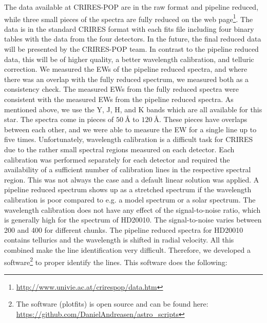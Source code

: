 \documentclass{aa}
\begin{document}
The data available at CRIRES-POP are in the raw format and pipeline
reduced, while three small pieces of the spectra are fully reduced on the web
page\footnote{\url{http://www.univie.ac.at/crirespop/data.htm}}. The data
is in the standard CRIRES format with each fits file including four
binary tables with the data from the four detectors. In the future, the final
reduced data will be presented by the CRIRES-POP team. In contrast to the pipeline reduced data, this
will be of higher quality, a better wavelength calibration, and telluric correction. We
measured the EWs of the pipeline reduced spectra, and where there was
an overlap with the fully reduced spectrum, we measured both as a
consistency check. The measured EWs from the fully reduced spectra were
consistent with the measured EWs from the pipeline reduced spectra. As
mentioned above, we use the Y, J, H, and K bands which are all available
for this star. The spectra come in pieces of $\SI{50}{\angstrom}$
to $\SI{120}{\angstrom}$. These pieces have overlaps between each
other, and we were able to measure the EW for a single line up to
five times. Unfortunately, wavelength calibration is a difficult task
for CRIRES due to the rather small spectral regions measured on each
detector. Each calibration was performed separately for each detector
and required the availability of a sufficient number of calibration
lines in the respective spectral region. This was not always the case
and a default linear solution was applied. A pipeline reduced spectrum
shows up as a stretched spectrum if the wavelength calibration is poor
compared to e.g. a model spectrum or a solar spectrum. The wavelength
calibration does not have any effect of the signal-to-noise ratio, which
is generally high for the spectrum of HD20010. The signal-to-noise
varies between 200 and 400 for different chunks. The pipeline reduced
spectra for HD20010 contains tellurics and the wavelength is shifted in
radial velocity. All this combined make the line identification very
difficult. Therefore, we developed a software\footnote{The software
(plot\textunderscore{}fits) is open source and can be found here:
\url{https://github.com/DanielAndreasen/astro_scripts}} to proper
identify the lines. This software does the following:
\end{document}
